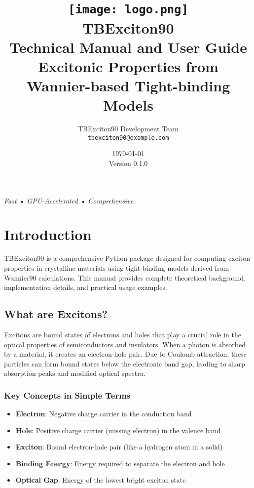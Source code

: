 \documentclass[11pt,a4paper]{article}
\title{
    \vspace{-2cm}
    \texttt{[image: logo.png]}\\[1cm]
    {\Huge \textbf{TBExciton90}}\\[0.5cm]
    {\Large Technical Manual and User Guide}\\[0.3cm]
    {\large Excitonic Properties from Wannier-based Tight-binding Models}
}
\author{
    TBExciton90 Development Team\\
    \texttt{tbexciton90@example.com}
}
\date{\today \\ Version 0.1.0}
\begin{document}
\maketitle
\thispagestyle{empty}

\vfill
\begin{center}
\textit{Fast • GPU-Accelerated • Comprehensive}
\end{center}

\newpage

\tableofcontents
\newpage

\section{Introduction}

TBExciton90 is a comprehensive Python package designed for computing exciton properties in crystalline materials using tight-binding models derived from Wannier90 calculations. This manual provides complete theoretical background, implementation details, and practical usage examples.

\subsection{What are Excitons?}

Excitons are bound states of electrons and holes that play a crucial role in the optical properties of semiconductors and insulators. When a photon is absorbed by a material, it creates an electron-hole pair. Due to Coulomb attraction, these particles can form bound states below the electronic band gap, leading to sharp absorption peaks and modified optical spectra.

\subsubsection{Key Concepts in Simple Terms}

\begin{itemize}
    \item \textbf{Electron}: Negative charge carrier in the conduction band
    \item \textbf{Hole}: Positive charge carrier (missing electron) in the valence band
    \item \textbf{Exciton}: Bound electron-hole pair (like a hydrogen atom in a solid)
    \item \textbf{Binding Energy}: Energy required to separate the electron and hole
    \item \textbf{Optical Gap}: Energy of the lowest bright exciton state
\end{itemize}
\end{document}
